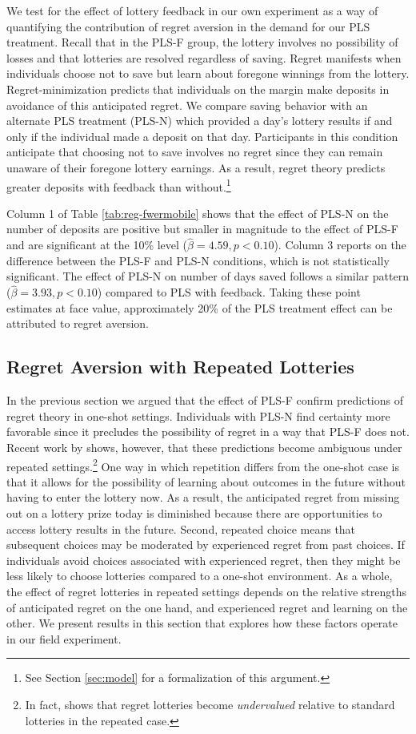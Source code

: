 \documentclass[12pt]{article}
\begin{document}
		We test for the effect of lottery feedback in our own experiment as a way of quantifying the contribution of regret aversion in the demand for our PLS treatment. Recall that in the PLS-F group, the lottery involves no possibility of losses and that lotteries are resolved regardless of saving. Regret manifests when individuals choose not to save but learn about foregone winnings from the lottery. Regret-minimization predicts that individuals on the margin make deposits in avoidance of this anticipated regret. We compare saving behavior with an alternate PLS treatment (PLS-N) which provided a day's lottery results if and only if the individual made a deposit on that day. Participants in this condition anticipate that choosing not to save involves no regret since they can remain unaware of their foregone lottery earnings. As a result, regret theory predicts greater deposits with feedback than without.\footnote{See Section \ref{sec:model} for a formalization of this argument.}

		Column 1 of Table \ref{tab:reg-fwermobile} shows that the effect of PLS-N on the number of deposits are positive but smaller in magnitude to the effect of PLS-F and are significant at the 10\% level ($\hat \beta = 4.59, p < 0.10$). Column 3 reports on the difference between the PLS-F and PLS-N conditions, which is not statistically significant. The effect of PLS-N on number of days saved follows a similar pattern ($\hat \beta = 3.93, p < 0.10$) compared to PLS with feedback. Taking these point estimates at face value, approximately 20\% of the PLS treatment effect can be attributed to regret aversion.

	\subsection{Regret Aversion with Repeated Lotteries}

		In the previous section we argued that the effect of PLS-F confirm predictions of regret theory in one-shot settings. Individuals with PLS-N find certainty more favorable since it precludes the possibility of regret in a way that PLS-F does not. Recent work by \textcite{imas_regret_2016} shows, however, that these predictions become ambiguous under repeated settings.\footnote{In fact, \textcite{imas_regret_2016} shows that regret lotteries become \emph{undervalued} relative to standard lotteries in the repeated case.} One way in which repetition differs from the one-shot case is that it allows for the possibility of learning about outcomes in the future without having to enter the lottery now. As a result, the anticipated regret from missing out on a lottery prize today is diminished because there are opportunities to access lottery results in the future. Second, repeated choice means that subsequent choices may be moderated by experienced regret from past choices. If individuals avoid choices associated with experienced regret, then they might be less likely to choose lotteries compared to a one-shot environment. As a whole, the effect of regret lotteries in repeated settings depends on the relative strengths of anticipated regret on the one hand, and experienced regret and learning on the other. We present results in this section that explores how these factors operate in our field experiment.
\end{document}
